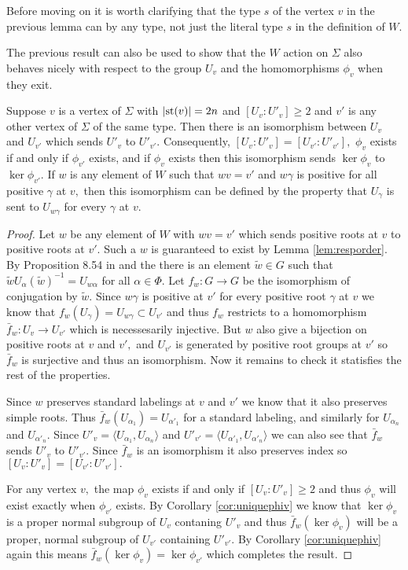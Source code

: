 \documentclass[class=book, crop=false,12 pt]{standalone}
\begin{document}
Before moving on it is worth clarifying that the type $s$ of the vertex $v$ in the previous lemma can by any type, not just the literal type $s$ in the definition of $W.$

The previous result can also be used to show that the $W$ action on $\Sigma$ also behaves nicely with respect to the group $U_v$ and the homomorphisms $\phi_v$ when they exit.
\begin{cor}
	\label{cor:respectphiv}
	Suppose $v$ is a vertex of $\Sigma$ with $|\mathrm{st}(v)|=2n$ and $[U_v:U'_v]\ge 2$ and $v'$ is any other vertex of $\Sigma$ of the same type. Then there is an isomorphism between $U_v$ and $U_{v'}$ which sends $U'_v$ to $U'_{v'}.$ Consequently, $[U_v:U'_v]=[U_{v'}:U'_{v'}],$ $\phi_v$ exists if and only if $\phi_{v'}$ exists, and if $\phi_v$ exists then this isomorphism sends $\ker \phi_v$ to $\ker \phi_{v'}.$ If $w$ is any element of $W$ such that $wv=v'$ and $w\gamma$ is positive for all positive $\gamma$ at $v,$ then this isomorphism can be defined by the property that $U_\gamma$ is sent to $U_{w\gamma}$ for every $\gamma$ at $v.$
\end{cor}
\begin{proof}
	Let $w$ be any element of $W$ with $wv=v'$ which sends positive roots at $v$ to positive roots at $v'.$ Such a $w$ is guaranteed to exist by Lemma \ref{lem:resporder}. By Proposition 8.54 in \cite{buildings} and the there is an element $\tilde{w}\in G$ such that $\tilde{w}U_\alpha (\tilde{w})^{-1}=U_{w\alpha}$ for all $\alpha\in \Phi.$ Let $f_w:G\to G$ be the isomorphism of conjugation by $\tilde{w}.$ Since $w\gamma$ is positive at $v'$ for every positive root $\gamma$ at $v$ we know that $f_w(U_\gamma)=U_{w\gamma}\subset U_{v'}$ and thus $f_w$ restricts to a homomorphism $\bar{f}_w:U_v\to U_{v'}$ which is necessesarily injective. But $w$ also give a bijection on positive roots at $v$ and $v',$ and $U_{v'}$ is generated by positive root groups at $v'$ so $\bar{f}_w$ is surjective and thus an isomorphism. Now it remains to check it statisfies the rest of the properties. 

	Since $w$ preserves standard labelings at $v$ and $v'$ we know that it also preserves simple roots. Thus $\bar{f}_w(U_{\alpha_1})=U_{\alpha'_1}$ for a standard labeling, and similarly for $U_{\alpha_n}$ and $U_{\alpha'_n}.$ Since $U'_v=\langle U_{\alpha_1},U_{\alpha_n}\rangle$ and $U'_{v'}=\langle U_{\alpha'_1},U_{\alpha'_n}\rangle$ we can also see that $\bar{f}_w$ sends $U'_v$ to $U'_{v'}.$ Since $\bar{f}_w$ is an isomorphism it also preserves index so $[U_v:U'_v]=[U_{v'}:U'_{v'}].$

	For any vertex $v,$ the map $\phi_v$ exists if and only if $[U_v:U'_v]\ge 2$ and thus $\phi_v$ will exist exactly when $\phi_{v'}$ exists. By Corollary \ref{cor:uniquephiv} we know that $\ker \phi_v$ is a proper normal subgroup of $U_v$ contaning $U'_v$ and thus $\bar{f}_w(\ker \phi_v)$ will be a proper, normal subgroup of $U_{v'}$ containing $U'_{v'}.$ By Corollary \ref{cor:uniquephiv} again this means $\bar{f}_w(\ker \phi_v)=\ker \phi_{v'}$ which completes the result.

\end{proof}
\end{document}
